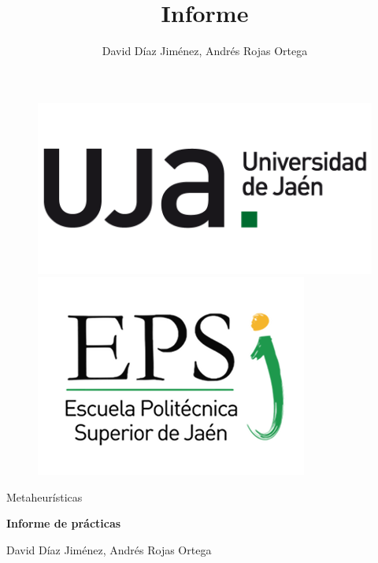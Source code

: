 \documentclass{article}
\title{Informe}
\author{David Díaz Jiménez, Andrés Rojas Ortega}
\begin{document}
	
	\begin{figure}[t]
		\centering
		\includegraphics[scale=0.2]{img/np_UJA_generica_6.png}
		\includegraphics[scale=0.35]{img/Logo_EPS.png}
		
	\end{figure}
	
	\begin{center}
		
		\begin{large}
			
			Metaheurísticas
			
		\end{large}
		
		\vspace*{0.2in}
		\textbf{\large Informe de prácticas}
		
		\vspace*{.2in}
		
		David Díaz Jiménez, Andrés Rojas Ortega
		
		\vspace*{2.5cm}
		
	\end{center}

	\tableofcontents
	
	\newpage
	
\end{document}
